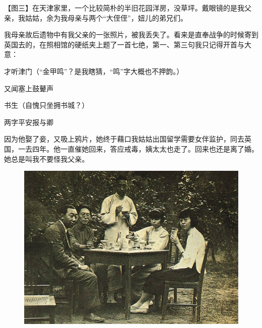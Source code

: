 \clearpage
\par 【图三】在天津家里，一个比较简朴的半旧花园洋房，没草坪。戴眼镜的是我父亲，我姑姑，余为我母亲与两个“大侄侄”，妞儿的弟兄们。
\par 我母亲故后遗物中有我父亲的一张照片，被我丢失了。看来是直奉战争的时候寄到英国去的，在照相馆的硬纸夹上题了一首七绝，第一、第三句我只记得开首与大意：
\par 才听津门（“金甲鸣”？是我瞎猜，“鸣”字大概也不押韵。）
\par 又闻塞上鼓鼙声
\par 书生（自愧只坐拥书城？）
\par 两字平安报与卿
\par 因为他娶了妾，又吸上鸦片，她终于藉口我姑姑出国留学需要女伴监护，同去英国，一去四年。他一直催她回来，答应戒毒，姨太太也走了。回来也还是离了婚。她总是叫我不要怪我父亲。
\begin{figure}[htb]
    \centering %
    \includegraphics[scale=0.4]{picture/对照记3.jpeg}
\end{figure}

